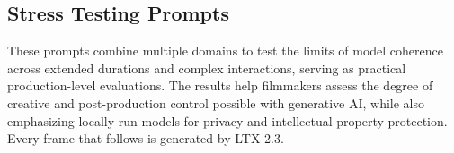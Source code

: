 \documentclass[sigconf]{acmart}
\begin{document}
\subsection{Stress Testing Prompts}
\label{sec:stress_prompts}
These prompts combine multiple domains to test the limits of model coherence across extended durations and complex interactions, serving as practical production-level evaluations. The results help filmmakers assess the degree of creative and post-production control possible with generative AI, while also emphasizing locally run models for privacy and intellectual property protection. Every frame that follows is generated by LTX 2.3.




\end{document}
